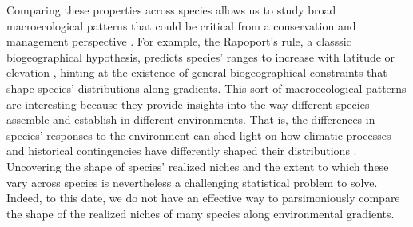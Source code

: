 \documentclass[11pt, a4paper]{article}
\begin{document}
Comparing these properties across species allows us to study broad macroecological patterns that could be critical from a conservation and management perspective \citep{stevensElevationalGradientAltitudinal1992, bernat}. For example, the Rapoport's rule, a classsic biogeographical hypothesis, predicts species' ranges to increase with latitude or elevation \citep{stevensElevationalGradientAltitudinal1992, bernat}, hinting at the existence of general biogeographical constraints that shape species' distributions along gradients. This sort of macroecological patterns are interesting because they provide insights into the way different species assemble and establish in different environments. That is, the differences in species' responses to the environment can shed light on how climatic processes and historical contingencies have differently shaped their distributions \citep{rohdeLatitudinalGradientsSpecies1992, more in Rapoport}. Uncovering the shape of species' realized niches and the extent to which these vary across species is nevertheless a challenging statistical problem to solve. Indeed, to this date, we do not have an effective way to parsimoniously compare the shape of the realized niches of many species along environmental gradients.
\end{document}
